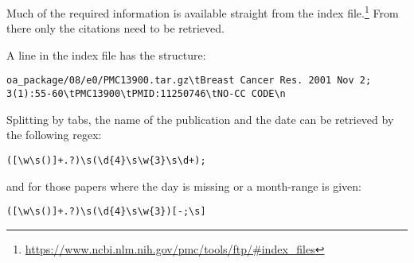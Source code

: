\documentclass[11pt]{article}
\begin{document}
Much of the required information is available straight from the index file.\footnote{\url{https://www.ncbi.nlm.nih.gov/pmc/tools/ftp/\#index_files}} From there only the citations need to be retrieved.

A line in the index file has the structure:
\begin{verbatim}
oa_package/08/e0/PMC13900.tar.gz\tBreast Cancer Res. 2001 Nov 2; 3(1):55-60\tPMC13900\tPMID:11250746\tNO-CC CODE\n
\end{verbatim}
Splitting by tabs, the name of the publication and the date can be retrieved by the following regex:
\begin{verbatim}
([\w\s()]+.?)\s(\d{4}\s\w{3}\s\d+);
\end{verbatim}
and for those papers where the day is missing or a month-range is given:
\begin{verbatim}
([\w\s()]+.?)\s(\d{4}\s\w{3})[-;\s]
\end{verbatim}
\end{document}

